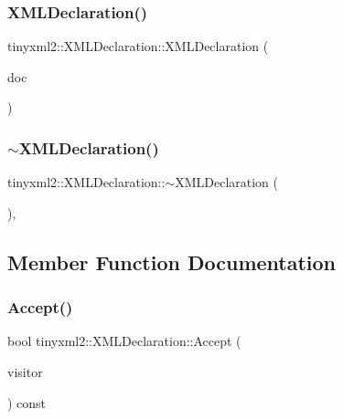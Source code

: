 \subsubsection{\texorpdfstring{X\+M\+L\+Declaration()}{XMLDeclaration()}}
{\footnotesize\ttfamily tinyxml2\+::\+X\+M\+L\+Declaration\+::\+X\+M\+L\+Declaration (\begin{DoxyParamCaption}\item[{\hyperlink{classtinyxml2_1_1_x_m_l_document}{X\+M\+L\+Document} $\ast$}]{doc }\end{DoxyParamCaption})\hspace{0.3cm}{\ttfamily [protected]}}

\mbox{\label{classtinyxml2_1_1_x_m_l_declaration_ab93d5bf4f5d58b4144963cf739cf6dcc}} 
\subsubsection{\texorpdfstring{$\sim$\+X\+M\+L\+Declaration()}{~XMLDeclaration()}}
{\footnotesize\ttfamily tinyxml2\+::\+X\+M\+L\+Declaration\+::$\sim$\+X\+M\+L\+Declaration (\begin{DoxyParamCaption}{ }\end{DoxyParamCaption})\hspace{0.3cm}{\ttfamily [protected]}, {\ttfamily [virtual]}}



\subsection{Member Function Documentation}
\mbox{\label{classtinyxml2_1_1_x_m_l_declaration_acf47629d9fc08ed6f1c164a97bcf794b}} 
\subsubsection{\texorpdfstring{Accept()}{Accept()}}
{\footnotesize\ttfamily bool tinyxml2\+::\+X\+M\+L\+Declaration\+::\+Accept (\begin{DoxyParamCaption}\item[{\hyperlink{classtinyxml2_1_1_x_m_l_visitor}{X\+M\+L\+Visitor} $\ast$}]{visitor }\end{DoxyParamCaption}) const\hspace{0.3cm}{\ttfamily [virtual]}}

